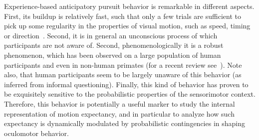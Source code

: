 \documentclass[10pt,letterpaper]{article}
\newcommand{\citep}[1]{\cite{#1}}
\newcommand{\citet}[1]{\cite{#1}}
\begin{document}
Experience-based anticipatory pursuit behavior is remarkable
in different aspects.
First, its buildup is relatively fast, such that only a few trials are sufficient
to pick up some regularity in the properties of visual motion, such as speed, timing or direction~\citep{Kowler1984,Maus2015,Deravet_JOV2018}.
Second, it is in general an unconscious process
of which participants are not aware of.
Second, phenomenologically it is a robust phenomenon, which has been observed on a large population of human participants and even in non-human primates (for a recent review see~\citet{Kowler_AnnRev2019}). Note also, that human participants seem to be largely unaware of this behavior (as inferred from informal questioning). Finally, this kind of behavior has proven to be exquisitely sensitive to the probabilistic properties of the sensorimotor context.
Therefore, this behavior is potentially a useful marker
to study the internal representation of motion expectancy, %
and in particular to analyze how such expectancy
is dynamically modulated by probabilistic contingencies in shaping oculomotor behavior.
\end{document}
